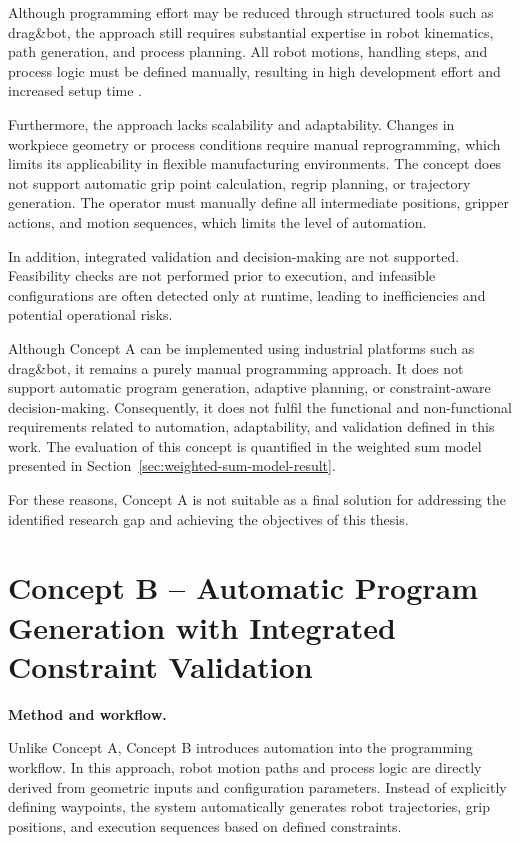 Although programming effort may be reduced through structured tools such as drag\&bot, the approach still requires substantial expertise in robot kinematics, path generation, and process planning. All robot motions, handling steps, and process logic must be defined manually, resulting in high development effort and increased setup time \cite{Pan2012Survey,Siciliano2016Robotics}.

Furthermore, the approach lacks scalability and adaptability. Changes in workpiece geometry or process conditions require manual reprogramming, which limits its applicability in flexible manufacturing environments. The concept does not support automatic grip point calculation, regrip planning, or trajectory generation. The operator must manually define all intermediate positions, gripper actions, and motion sequences, which limits the level of automation.

In addition, integrated validation and decision-making are not supported. Feasibility checks are not performed prior to execution, and infeasible configurations are often detected only at runtime, leading to inefficiencies and potential operational risks.

Although Concept A can be implemented using industrial platforms such as drag\&bot, it remains a purely manual programming approach. It does not support automatic program generation, adaptive planning, or constraint-aware decision-making. Consequently, it does not fulfil the functional and non-functional requirements related to automation, adaptability, and validation defined in this work. The evaluation of this concept is quantified in the weighted sum model presented in Section~\ref{sec:weighted-sum-model-result}.

For these reasons, Concept A is not suitable as a final solution for addressing the identified research gap and achieving the objectives of this thesis.

\section{Concept B -- Automatic Program Generation with Integrated Constraint Validation}
\label{sec:concept-b-validation}

\label{sec:concept-b-methodological-framework}
\noindent\textbf{Method and workflow.}

Unlike Concept A, Concept B introduces automation into the programming workflow. In this approach, robot motion paths and process logic are directly derived from geometric inputs and configuration parameters. Instead of explicitly defining waypoints, the system automatically generates robot trajectories, grip positions, and execution sequences based on defined constraints.

